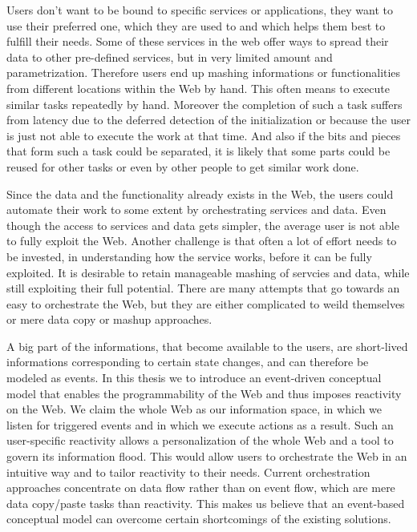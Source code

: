Users don't want to be bound to specific services or applications, they want to use their preferred one, which they are used to and which helps them best to fulfill their needs.
Some of these services in the web offer ways to spread their data to other pre-defined services, but in very limited amount and parametrization.
Therefore users end up mashing informations or functionalities from different locations within the Web by hand.
This often means to execute similar tasks repeatedly by hand.
Moreover the completion of such a task suffers from latency due to the deferred detection of the initialization or because the user is just not able to execute the work at that time.
And also if the bits and pieces that form such a task could be separated, it is likely that some parts could be reused for other tasks or even by other people to get similar work done.

Since the data and the functionality already exists in the Web, the users could automate their work to some extent by orchestrating services and data.
Even though the access to services and data gets simpler, the average user is not able to fully exploit the Web.
Another challenge is that often a lot of effort needs to be invested, in understanding how the service works, before it can be fully exploited.
It is desirable to retain manageable mashing of servcies and data, while still exploiting their full potential.
There are many attempts that go towards an easy to orchestrate the Web, but they are either complicated to weild themselves or mere data copy or mashup approaches.

A big part of the informations, that become available to the users, are short-lived informations corresponding to certain state changes, and can therefore be modeled as events.
In this thesis we to introduce an event-driven conceptual model that enables the programmability of the Web and thus imposes reactivity on the Web.
We claim the whole Web as our information space, in which we listen for triggered events and in which we execute actions as a result.
Such an user-specific reactivity allows a personalization of the whole Web and a tool to govern its information flood.
This would allow users to orchestrate the Web in an intuitive way and to tailor reactivity to their needs.
Current orchestration approaches concentrate on data flow rather than on event flow, which are mere data copy/paste tasks than reactivity.
This makes us believe that an event-based conceptual model can overcome certain shortcomings of the existing solutions.

